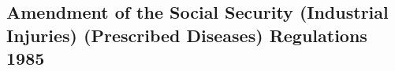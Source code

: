 \documentclass[12pt,a4paper]{article}
\begin{document}
%
%
%
%
%
%
%
%


\subsection[5. Amendment of the Social Security (Industrial Injuries) (Prescribed Diseases) Regulations 1985]{Amendment of the Social Security (Industrial Injuries) (Prescribed Diseases) Regulations 1985}
\end{document}
